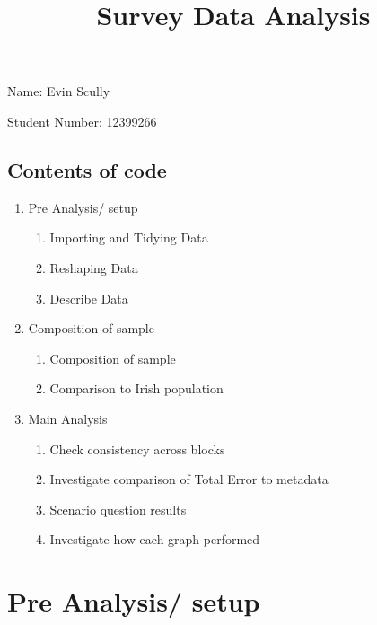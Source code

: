 \documentclass[11pt]{article}
\title{Survey Data Analysis}
\providecommand{\tightlist}{%
      \setlength{\itemsep}{0pt}\setlength{\parskip}{0pt}}
\begin{document}
    
    
    \maketitle
    
    

    
    Name: Evin Scully

Student Number: 12399266

    \subsection{Contents of code}\label{contents-of-code}

\begin{enumerate}
\def\labelenumi{\arabic{enumi}.}
\tightlist
\item
  Pre Analysis/ setup

  \begin{enumerate}
  \def\labelenumii{\arabic{enumii}.}
  \tightlist
  \item
    Importing and Tidying Data
  \item
    Reshaping Data
  \item
    Describe Data
  \end{enumerate}
\item
  Composition of sample

  \begin{enumerate}
  \def\labelenumii{\arabic{enumii}.}
  \tightlist
  \item
    Composition of sample
  \item
    Comparison to Irish population
  \end{enumerate}
\item
  Main Analysis

  \begin{enumerate}
  \def\labelenumii{\arabic{enumii}.}
  \tightlist
  \item
    Check consistency across blocks
  \item
    Investigate comparison of Total Error to metadata
  \item
    Scenario question results
  \item
    Investigate how each graph performed
  \end{enumerate}
\end{enumerate}

    \section{Pre Analysis/ setup}\label{pre-analysis-setup}
\end{document}
